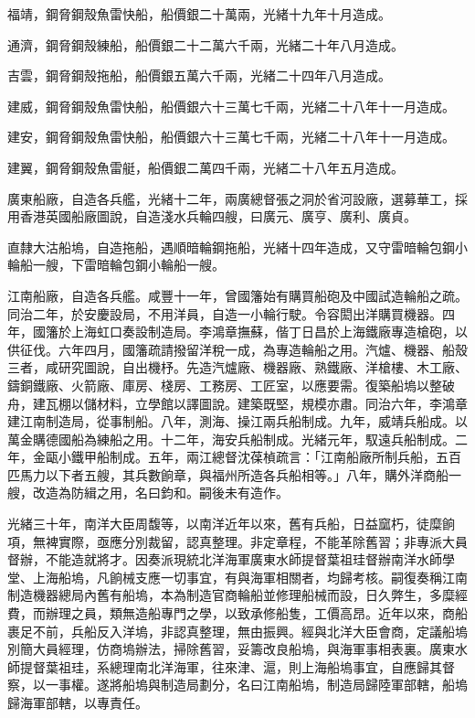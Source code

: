 \begin{pinyinscope}
福靖，鋼脅鋼殼魚雷快船，船價銀二十萬兩，光緒十九年十月造成。

通濟，鋼脅鋼殼練船，船價銀二十二萬六千兩，光緒二十年八月造成。

吉雲，鋼脅鋼殼拖船，船價銀五萬六千兩，光緒二十四年八月造成。

建威，鋼脅鋼殼魚雷快船，船價銀六十三萬七千兩，光緒二十八年十一月造成。

建安，鋼脅鋼殼魚雷快船，船價銀六十三萬七千兩，光緒二十八年十一月造成。

建翼，鋼脅鋼殼魚雷艇，船價銀二萬四千兩，光緒二十八年五月造成。

廣東船廠，自造各兵艦，光緒十二年，兩廣總督張之洞於省河設廠，選募華工，採用香港英國船廠圖說，自造淺水兵輪四艘，曰廣元、廣亨、廣利、廣貞。

直隸大沽船塢，自造拖船，遇順暗輪鋼拖船，光緒十四年造成，又守雷暗輪包鋼小輪船一艘，下雷暗輪包鋼小輪船一艘。

江南船廠，自造各兵艦。咸豐十一年，曾國籓始有購買船砲及中國試造輪船之疏。同治二年，於安慶設局，不用洋員，自造一小輪行駛。令容閎出洋購買機器。四年，國籓於上海虹口奏設制造局。李鴻章撫蘇，偕丁日昌於上海鐵廠專造槍砲，以供征伐。六年四月，國籓疏請撥留洋稅一成，為專造輪船之用。汽爐、機器、船殼三者，咸研究圖說，自出機杼。先造汽爐廠、機器廠、熟鐵廠、洋槍樓、木工廠、鑄銅鐵廠、火箭廠、庫房、棧房、工務房、工匠室，以應要需。復築船塢以整破舟，建瓦棚以儲材料，立學館以譯圖說。建築既堅，規模亦肅。同治六年，李鴻章建江南制造局，從事制船。八年，測海、操江兩兵船制成。九年，威靖兵船成。以萬金購德國船為練船之用。十二年，海安兵船制成。光緒元年，馭遠兵船制成。二年，金甌小鐵甲船制成。五年，兩江總督沈葆楨疏言：「江南船廠所制兵船，五百匹馬力以下者五艘，其兵數餉章，與福州所造各兵船相等。」八年，購外洋商船一艘，改造為防緝之用，名曰鈞和。嗣後未有造作。

光緒三十年，南洋大臣周馥等，以南洋近年以來，舊有兵船，日益窳朽，徒糜餉項，無裨實際，亟應分別裁留，認真整理。非定章程，不能革除舊習；非專派大員督辦，不能造就將才。因奏派現統北洋海軍廣東水師提督葉祖珪督辦南洋水師學堂、上海船塢，凡餉械支應一切事宜，有與海軍相關者，均歸考核。嗣復奏稱江南制造機器總局內舊有船塢，本為制造官商輪船並修理船械而設，日久弊生，多糜經費，而辦理之員，類無造船專門之學，以致承修船隻，工價高昂。近年以來，商船裹足不前，兵船反入洋塢，非認真整理，無由振興。經與北洋大臣會商，定議船塢別簡大員經理，仿商塢辦法，掃除舊習，妥籌改良船塢，與海軍事相表裏。廣東水師提督葉祖珪，系總理南北洋海軍，往來津、滬，則上海船塢事宜，自應歸其督察，以一事權。遂將船塢與制造局劃分，名曰江南船塢，制造局歸陸軍部轄，船塢歸海軍部轄，以專責任。


\end{pinyinscope}
